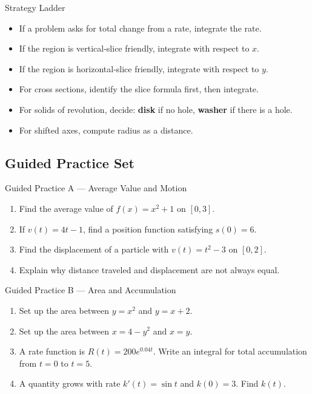 \documentclass[11pt]{article}
\begin{document}
\vspace{1em}

\begin{summarybox}{Strategy Ladder}
\begin{itemize}
    \item If a problem asks for total change from a rate, integrate the rate.
    \item If the region is vertical-slice friendly, integrate with respect to \(x\).
    \item If the region is horizontal-slice friendly, integrate with respect to \(y\).
    \item For cross sections, identify the slice formula first, then integrate.
    \item For solids of revolution, decide: \textbf{disk} if no hole, \textbf{washer} if there is a hole.
    \item For shifted axes, compute radius as a distance.
\end{itemize}
\end{summarybox}

\newpage
\subsection{Guided Practice Set}

\begin{practicebox}{Guided Practice A --- Average Value and Motion}
\begin{enumerate}
    \item Find the average value of \(f(x)=x^2+1\) on \([0,3]\).
    \item If \(v(t)=4t-1\), find a position function satisfying \(s(0)=6\).
    \item Find the displacement of a particle with \(v(t)=t^2-3\) on \([0,2]\).
    \item Explain why distance traveled and displacement are not always equal.
\end{enumerate}
\end{practicebox}

\begin{practicebox}{Guided Practice B --- Area and Accumulation}
\begin{enumerate}
    \item Set up the area between \(y=x^2\) and \(y=x+2\).
    \item Set up the area between \(x=4-y^2\) and \(x=y\).
    \item A rate function is \(R(t)=200e^{0.04t}\). Write an integral for total accumulation from \(t=0\) to \(t=5\).
    \item A quantity grows with rate \(k'(t)=\sin t\) and \(k(0)=3\). Find \(k(t)\).
\end{enumerate}
\end{practicebox}
\end{document}
